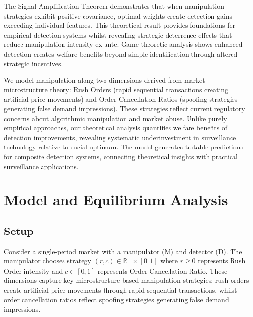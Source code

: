 \documentclass[12pt]{article}
\begin{document}
The Signal Amplification Theorem demonstrates that when manipulation strategies exhibit positive covariance, optimal weights create detection gains exceeding individual features. This theoretical result provides foundations for empirical detection systems whilst revealing strategic deterrence effects that reduce manipulation intensity ex ante. Game-theoretic analysis shows enhanced detection creates welfare benefits beyond simple identification through altered strategic incentives.

We model manipulation along two dimensions derived from market microstructure theory: Rush Orders (rapid sequential transactions creating artificial price movements) and Order Cancellation Ratios (spoofing strategies generating false demand impressions). These strategies reflect current regulatory concerns about algorithmic manipulation and market abuse. Unlike purely empirical approaches, our theoretical analysis quantifies welfare benefits of detection improvements, revealing systematic underinvestment in surveillance technology relative to social optimum. The model generates testable predictions for composite detection systems, connecting theoretical insights with practical surveillance applications.

\section{Model and Equilibrium Analysis}

\subsection{Setup}

Consider a single-period market with a manipulator (M) and detector (D). The manipulator chooses strategy $(r,c) \in \mathbb{R}_+ \times [0,1]$ where $r \geq 0$ represents Rush Order intensity and $c \in [0,1]$ represents Order Cancellation Ratio. These dimensions capture key microstructure-based manipulation strategies: rush orders create artificial price movements through rapid sequential transactions, whilst order cancellation ratios reflect spoofing strategies generating false demand impressions.
\end{document}
